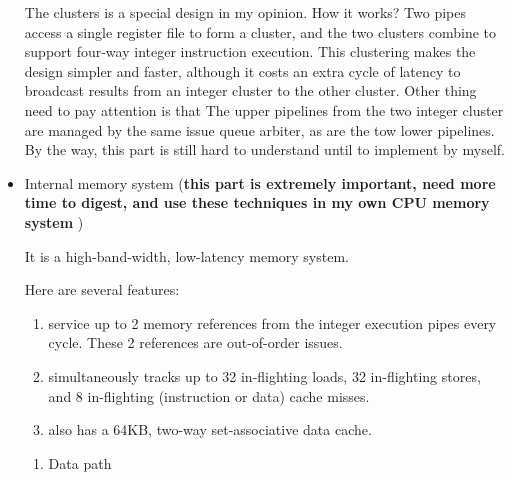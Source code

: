 \documentclass[11pt]{article}
\newcommand{\emphasize}[1]{\huge{#1}\normalsize}
\begin{document}
\begin{itemize}
	The clusters is a special design in my opinion. How it works? Two pipes access a single register file to form a cluster, and the two clusters combine to support four-way integer instruction execution. This clustering makes the design simpler and faster, although it costs an extra cycle of latency to broadcast results from an integer cluster to the other cluster. Other thing need to pay attention is that The upper pipelines from the two integer cluster are managed by the same issue queue arbiter, as are the tow lower pipelines. By the way, this part is still hard to understand until to implement by myself.
	\item \emphasize{Internal memory system (\textbf{this part is extremely important, need more time to digest, and use these techniques in my own CPU memory system })}
	
	It is a high-band-width, low-latency memory system.
	
	Here are several features: \begin{enumerate}
		\item service up to 2 memory references from the integer execution pipes every cycle. These 2 references are out-of-order issues.
		\item simultaneously tracks up to 32 in-flighting loads, 32 in-flighting stores, and 8 in-flighting (instruction or data) cache misses.
		\item also has a 64KB, two-way set-associative data cache.
	\end{enumerate}
	\begin{enumerate}
		\item Data path
		

\end{enumerate}
\end{itemize}
\end{document}
